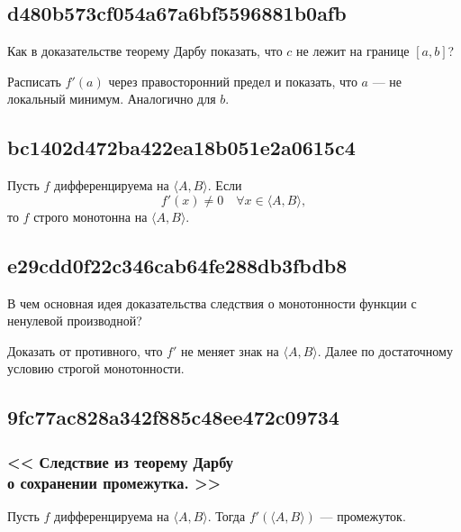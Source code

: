 \documentclass[11pt, a5paper]{article}
\newenvironment{note}[1]{\goodbreak\par\subsection{\hfill \color{lightgray}\tiny #1}}{}
\newenvironment{cloze}[2][\ldots]{\begin{leftbar}}{\end{leftbar}}
\newenvironment{icloze}[2][\ldots]{%
  \ignorespaces\text{\tiny \color{lightgray}\{#2} %
}{%
  \text{\tiny\color{lightgray}\}}\unskip%
}
\begin{document}
\begin{note}{d480b573cf054a67a6bf5596881b0afb}
    Как в доказательстве теорему Дарбу показать, что \( c \) не лежит на границе \( [a, b] \)?

    \begin{cloze}{1}
        Расписать \( f'(a) \) через правосторонний предел и показать, что \( a \) --- не локальный минимум. Аналогично для \( b \).
    \end{cloze}
\end{note}

\begin{note}{bc1402d472ba422ea18b051e2a0615c4}
    Пусть \begin{icloze}{3}\( f \) дифференцируема на \( \langle A, B \rangle  \).\end{icloze} Если
    \begin{icloze}{2}\[
        f'(x) \neq 0 \quad \forall x \in \langle A, B \rangle,
    \]\end{icloze}
    то \begin{icloze}{1}\( f \) строго монотонна на \( \langle A, B \rangle  \).\end{icloze}
\end{note}

\begin{note}{e29cdd0f22c346cab64fe288db3fbdb8}
    В чем основная идея доказательства следствия о монотонности функции с ненулевой производной?

    \begin{cloze}{1}
        Доказать от противного, что \( f' \) не меняет знак на \( \langle A, B \rangle  \).
        Далее по достаточному условию строгой монотонности.
    \end{cloze}
\end{note}

\begin{note}{9fc77ac828a342f885c48ee472c09734}
    \subsubsection{<<\begin{icloze}{2}Следствие из теорему Дарбу \\
    \phantom{<<} \quad о сохранении промежутка.\end{icloze}>>}

    \begin{icloze}{1}Пусть \( f \) дифференцируема на \( \langle A, B \rangle  \). Тогда \( f'(\langle A, B \rangle ) \) --- промежуток.\end{icloze}
\end{note}
\end{document}
